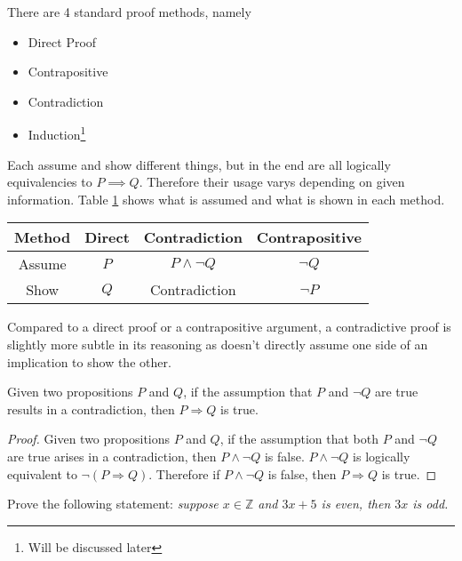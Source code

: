 \documentclass[../notes.tex]{subfiles}
\begin{document}

There are 4 standard proof methods, namely
\begin{itemize}
	\item Direct Proof
	\item Contrapositive
	\item Contradiction
	\item Induction\footnote{Will be discussed later}
\end{itemize}

Each assume and show different things, but in the end are all logically equivalencies to $P \implies Q$. Therefore their usage varys depending on given information. Table \ref{tbl:proofmethods} shows what is assumed and what is shown in each method.

\begin{table}[h!]
	\centering
	\begin{tabular}{c | c c c}
		\textbf{Method} & \textbf{Direct} & \textbf{Contradiction} & \textbf{Contrapositive} \\\hline
		Assume & $P$ & $P \land\lnot Q$ & $\lnot Q$ \\
		Show   & $Q$ & Contradiction & $\lnot P$ \\
	\end{tabular}
	\label{tbl:proofmethods}
\end{table}

Compared to a direct proof or a contrapositive argument, a contradictive proof is slightly more subtle in its reasoning as doesn't directly assume one side of an implication to show the other.

\begin{theorem}
  Given two propositions $P$ and $Q$, if the assumption that $P$ and $\lnot Q$ are true results in a contradiction, then $P \Longrightarrow Q$ is true.
\end{theorem}
\begin{proof}
	Given two propositions $P$ and $Q$, if the assumption that both $P$ and $\lnot Q$ are true arises in a contradiction, then $P \land \lnot Q$ is false. $P \land \lnot Q$ is logically equivalent to $\lnot (P \Longrightarrow Q)$. Therefore if $P \land \lnot Q$ is false, then $P \Longrightarrow Q$ is true.
\end{proof}

\begin{example}
	Prove the following statement: \textit{suppose $x \in \mathbb{Z}$ and $3x + 5$ is even, then $3x$ is odd.}
\end{example}
\end{document}
